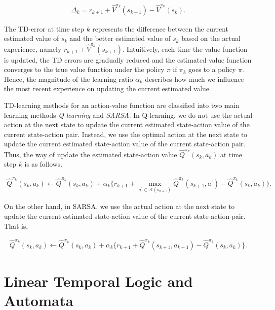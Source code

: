 \begin{align}
  \Delta_k = r_{k+1} + \hat{V}^{\pi_k}(s_{k+1}) - \hat{V}^{\pi_k}(s_k).
\end{align}

The TD-error at time step $k$ represents the difference between the current estimated value of $s_k$ and the better estimated value of $s_k$ based on the actual experience, namely $r_{k+1} + \hat{V}^{\pi_k}(s_{k+1})$. Intuitively, each time the value function is updated, the TD errors are gradually reduced and the estimated value function converges to the true value function under the policy $\pi$ if $\pi_k$ goes to a policy $\pi$. Hence, the magnitude of the learning ratio $\alpha_k$ describes how much we influence the most recent experience on updating the current estimated value.

TD-learning methods for an action-value function are classified into two main learning methods {\it Q-learning} and {\it SARSA}.
In Q-learning, we do not use the actual action at the next state to update the current estimated state-action value of the current state-action pair. Instead, we use the optimal action at the next state to update the current estimated state-action value of the current state-action pair. Thus, the way of update the estimated state-action value $\hat{Q}^{\pi_k}(s_k, a_k)$ at time step $k$ is as follows.

\begin{align}
  \hat{Q}^{\pi_k}(s_k,a_k) \leftarrow \hat{Q}^{\pi_k}(s_k,a_k) + \alpha_k \{ r_{k+1} + \max_{a^{\prime} \in \mathcal{A}(s_{k+1})} \hat{Q}^{\pi_k}(s_{k+1}, a^{\prime}) - \hat{Q}^{\pi_k}(s_k,a_k) \}.
\end{align}

On the other hand, in SARSA, we use the actual action at the next state to update the current estimated state-action value of the current state-action pair. That is,

\begin{align}
  \hat{Q}^{\pi_k}(s_k,a_k) \leftarrow \hat{Q}^{\pi_k}(s_k,a_k) + \alpha_k \{ r_{k+1} + \hat{Q}^{\pi_k}(s_{k+1}, a_{k+1}) - \hat{Q}^{\pi_k}(s_k,a_k) \}.
\end{align}

\section{Linear Temporal Logic and Automata}

